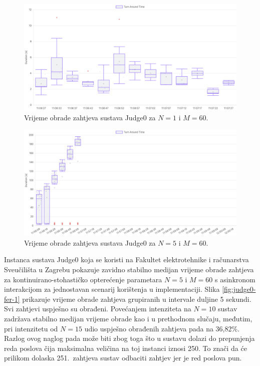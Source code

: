 \documentclass[times, utf8, diplomski]{fer}
\begin{document}
\begin{figure}[htb]
	\centering
	\includegraphics[width=\textwidth]{images/Judge0 TAT for 1 5s.png}
	\caption{
		Vrijeme obrade zahtjeva sustava Judge0 za $N=1$ i $M=60$.
	}
	\label{fig:judge0-1}
\end{figure}

\pagebreak

\begin{figure}[htb]
	\centering
	\includegraphics[width=\textwidth]{images/Judge0 TAT for 5 10s.png}
	\caption{
		Vrijeme obrade zahtjeva sustava Judge0 za $N=5$ i $M=60$.
	}
	\label{fig:judge0-2}
\end{figure}

Instanca sustava Judge0 koja se koristi na Fakultet elektrotehnike i računarstva Sveučilišta u Zagrebu pokazuje zavidno stabilno medijan vrijeme obrade zahtjeva za kontinuirano-stohastičko opterećenje parametara $N=5$ i $M=60$ s asinkronom interakcijom za jednostavan scenarij korištenja u  implementaciji. Slika \ref{fig:judge0-fer-1} prikazuje vrijeme obrade zahtjeva grupiranih u intervale duljine 5 sekundi. Svi zahtjevi uspješno su obrađeni. Povećanjem intenziteta na $N=10$ sustav zadržava stabilno medijan vrijeme obrade kao i u prethodnom slučaju, međutim, pri intenzitetu od $N=15$ udio uspješno obrađenih zahtjeva pada na 36,82\%. Razlog ovog naglog pada može biti zbog toga što u sustavu dolazi do prepunjenja reda poslova čija maksimalna veličina na toj instanci iznosi 250. To znači da će prilikom dolaska 251.\ zahtjeva sustav odbaciti zahtjev jer je red poslova pun.
\end{document}
